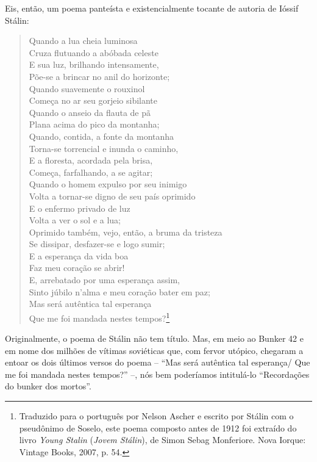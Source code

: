 Eis, então, um poema panteísta e existencialmente tocante de autoria de
Ióssif Stálin:

\begin{quote}
Quando a lua cheia luminosa~\\
Cruza flutuando a abóbada celeste~\\
E sua luz, brilhando intensamente,~\\
Põe-se a brincar no anil do horizonte;~\\[2\baselineskip]Quando
suavemente o rouxinol~\\
Começa no ar seu gorjeio sibilante~\\
Quando o anseio da flauta de pã~\\
Plana acima do pico da montanha;~\\[2\baselineskip]Quando, contida, a
fonte da montanha~\\
Torna-se torrencial e inunda o caminho,~\\
E a floresta, acordada pela brisa,~\\
Começa, farfalhando, a se agitar;~\\[2\baselineskip]Quando o homem
expulso por seu inimigo~\\
Volta a tornar-se digno de seu país oprimido~\\
E o enfermo privado de luz~\\
Volta a ver o sol e a lua;~\\[2\baselineskip]Oprimido também, vejo,
então, a bruma da tristeza~\\
Se dissipar, desfazer-se e logo sumir;~\\
E a esperança da vida boa~\\
Faz meu coração se abrir!~\\[2\baselineskip]E, arrebatado por uma
esperança assim,~\\
Sinto júbilo n'alma e meu coração bater em paz;~\\
Mas será autêntica tal esperança~\\
Que me foi mandada nestes tempos?\footnote{Traduzido para o português
  por Nelson Ascher e escrito por Stálin com o pseudônimo de Soselo,
  este poema composto antes de 1912 foi extraído do livro \emph{Young
  Stalin} (\emph{Jovem Stálin}), de Simon Sebag Monferiore. Nova Iorque:
  Vintage Books, 2007, p. 54.}
\end{quote}

Originalmente, o poema de Stálin não tem título. Mas, em meio ao Bunker
42 e em nome dos milhões de vítimas soviéticas que, com fervor utópico,
chegaram a entoar os dois últimos versos do poema -- ``Mas será
autêntica tal esperança/ Que me foi mandada nestes tempos?'' --, nós bem
poderíamos intitulá-lo ``Recordações do bunker dos mortos''.

